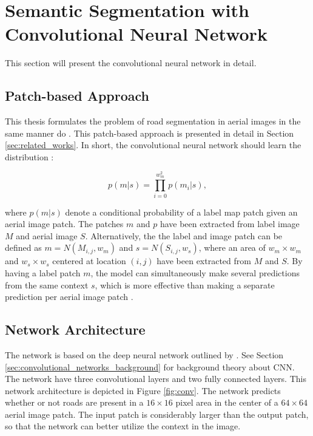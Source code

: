 \section{Semantic Segmentation with Convolutional Neural Network}
\label{sec:network}
This section will present the convolutional neural network in detail. 

\subsection{Patch-based Approach}
This thesis formulates the problem of road segmentation in aerial images in the same manner  \cite{Mnih_roads_high_res_aerial_images} do . This patch-based approach is presented in detail in Section \ref{sec:related_works}. In short, the convolutional neural network should learn the distribution :

$$ p(m|s) = \prod_{i=0}^{w_m^2}p(m_i | s),  $$

where $p(m|s)$ denote a conditional probability of a label map patch given an aerial image patch. The patches $m$ and $p$ have been extracted from label image $M$ and aerial image $S$. Alternatively, the the label and image patch can be defined as $m =N(M_{i,j}, w_m)$ and $ s = N(S_{i,j}, w_s)$, where an area of $w_m \times w_m$ and $w_s \times w_s$ centered at location $(i, j)$ have been extracted from $M$ and $S$. By having a label patch $m$, the model can simultaneously make several predictions from the same context $s$, which is more effective than making a separate prediction per aerial image patch . \\ 


\subsection{Network Architecture}
The network is based on the deep neural network outlined by \cite{MnihThesis}. See Section \ref{sec:convolutional_networks_background} for background theory about \ac{CNN}. The network have three convolutional layers and two fully connected layers. This network architecture is depicted in Figure \ref{fig:conv}. The network predicts whether or not roads are present in a $16 \times 16$ pixel area in the center of  a $64 \times 64$ aerial image patch. The input patch is considerably larger than the output patch, so that the network can better utilize the context in the image. \\

